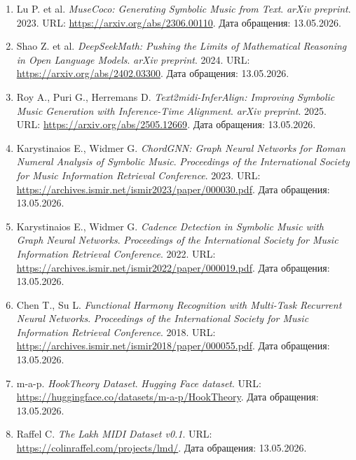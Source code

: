 \documentclass[a4paper,12pt]{extarticle}
\begin{document}
\begin{enumerate}
\item \label{ref:lu2023-musecoco} Lu P. et al. \textit{MuseCoco: Generating Symbolic Music from Text}. \textit{arXiv preprint}. 2023. URL: \url{https://arxiv.org/abs/2306.00110}. Дата обращения: 13.05.2026.

\item \label{ref:deepseekmath2024} Shao Z. et al. \textit{DeepSeekMath: Pushing the Limits of Mathematical Reasoning in Open Language Models}. \textit{arXiv preprint}. 2024. URL: \url{https://arxiv.org/abs/2402.03300}. Дата обращения: 13.05.2026.

\item \label{ref:text2midi-inferalign} Roy A., Puri G., Herremans D. \textit{Text2midi-InferAlign: Improving Symbolic Music Generation with Inference-Time Alignment}. \textit{arXiv preprint}. 2025. URL: \url{https://arxiv.org/abs/2505.12669}. Дата обращения: 13.05.2026.

\item \label{ref:karystinaios2023-chordgnn} Karystinaios E., Widmer G. \textit{ChordGNN: Graph Neural Networks for Roman Numeral Analysis of Symbolic Music}. \textit{Proceedings of the International Society for Music Information Retrieval Conference}. 2023. URL: \url{https://archives.ismir.net/ismir2023/paper/000030.pdf}. Дата обращения: 13.05.2026.

\item \label{ref:karystinaios2022-cadencegnn} Karystinaios E., Widmer G. \textit{Cadence Detection in Symbolic Music with Graph Neural Networks}. \textit{Proceedings of the International Society for Music Information Retrieval Conference}. 2022. URL: \url{https://archives.ismir.net/ismir2022/paper/000019.pdf}. Дата обращения: 13.05.2026.

\item \label{ref:chen2018-harmony-mtl} Chen T., Su L. \textit{Functional Harmony Recognition with Multi-Task Recurrent Neural Networks}. \textit{Proceedings of the International Society for Music Information Retrieval Conference}. 2018. URL: \url{https://archives.ismir.net/ismir2018/paper/000055.pdf}. Дата обращения: 13.05.2026.

\item \label{ref:hooktheory} m-a-p. \textit{HookTheory Dataset}. \textit{Hugging Face dataset}. URL: \url{https://huggingface.co/datasets/m-a-p/HookTheory}. Дата обращения: 13.05.2026.

\item \label{ref:lakh} Raffel C. \textit{The Lakh MIDI Dataset v0.1}. URL: \url{https://colinraffel.com/projects/lmd/}. Дата обращения: 13.05.2026.


\end{enumerate}
\end{document}
